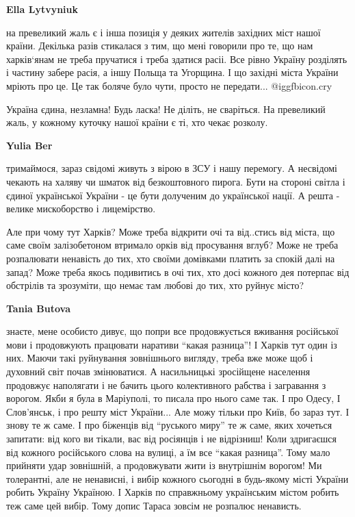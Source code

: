 \begin{itemize}
\begin{itemize}
\textbf{Ella Lytvyniuk} 

на превеликий жаль є і інша позиція у деяких жителів західних міст нашої
країни. Декілька разів стикалася з тим, що мені говорили про те, що нам
харків‘янам не треба пручатися і треба здатися расіі. Все рівно Україну
розділять і частину забере расія, а іншу Польща та Угорщина. І що західні міста
України мріють про це. Це так боляче було чути, просто не передати...  @igg{fbicon.cry} 

Україна єдина, незламна! Будь ласка! Не діліть, не сваріться. На превеликий
жаль, у кожному куточку нашої країни є ті, хто чекає розколу.

\textbf{Yulia Ber} 

тримаймося, зараз свідомі живуть з вірою в ЗСУ і нашу перемогу. А несвідомі
чекають на халяву чи шматок від безкоштовного пирога. Бути на стороні світла і
єдиної української України - це бути долученим до української нації. А решта -
велике мискоборство і лицемірство.


Але при чому тут Харків? Може треба відкрити очі та від..стись від міста, що
саме своїм залізобетоном втримало орків від просування вглуб? Може не треба
розпалювати ненавість до тих, хто своїми домівками платить за спокій далі на
запад? Може треба якось подивитись в очі тих, хто досі кожного дея потерпає від
обстрілів та зрозуміти, що немає там любові до тих, хто руйнує місто?

\textbf{Tania Butova} 

знаєте, мене особисто дивує, що попри все продовжується вживання російської
мови і продовжують працювати наративи \enquote{какая разница}! І Харків тут один із
них. Маючи такі руйнування зовнішнього вигляду, треба вже може щоб і духовний
світ почав змінюватися. А насильницькі зросійщене населення продовжує
наполягати і не бачить цього колективного рабства і загравання з ворогом. Якби
я була в Маріуполі, то писала про нього саме так. І про Одесу, І Слов'янськ, і
про решту міст України... Але можу тільки про Київ, бо зараз тут. І знову те ж
саме. І про біженців від \enquote{руського миру} те ж саме, яких хочеться запитати: від
кого ви тікали, вас від росіянців і не відрізниш! Коли здригаєшся від кожного
російського слова на вулиці, а їм все \enquote{какая разница}. Тому мало прийняти удар
зовнішній, а продовжувати жити із внутрішнім ворогом! Ми толерантні, але не
ненависні, і вибір кожного сьогодні в будь-якому місті України робить Україну
Україною. І Харків по справжньому українським містом робить теж саме цей вибір.
Тому допис Тараса зовсім не розпалює ненависть.


\end{itemize}
\end{itemize}
